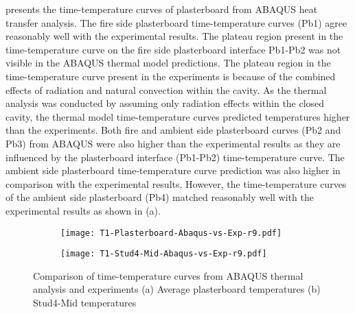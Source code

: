  presents the time-temperature curves of plasterboard from ABAQUS heat transfer analysis. The fire side plasterboard time-temperature curves (Pb1) agree reasonably well with the experimental results. The plateau region present in the time-temperature curve on the fire side plasterboard interface Pb1-Pb2 was not visible in the ABAQUS thermal model predictions. The plateau region in the time-temperature curve present in the experiments is because of the combined effects of radiation and natural convection within the cavity. As the thermal analysis was conducted by assuming only radiation effects within the closed cavity, the thermal model time-temperature curves predicted temperatures higher than the experiments. Both fire and ambient side plasterboard curves (Pb2 and Pb3) from ABAQUS were also higher than the experimental results as they are influenced by the plasterboard interface (Pb1-Pb2) time-temperature curve. The ambient side plasterboard time-temperature curve prediction was also higher in comparison with the experimental results. However, the time-temperature curves of the ambient side plasterboard (Pb4) matched reasonably well with the experimental results as shown in  (a).
\begin{figure}[!htbp]
	\centering
	\begin{subfigure}[b]{0.7\textwidth}
		\centering
		\texttt{[image: T1-Plasterboard-Abaqus-vs-Exp-r9.pdf]}
		\caption{}
		\label{subfig:T1-Plasterboard-Abaqus-vs-Exp-r9}
	\end{subfigure}
	\begin{subfigure}[b]{0.6\textwidth}
		\centering
		\texttt{[image: T1-Stud4-Mid-Abaqus-vs-Exp-r9.pdf]}
		\caption{}
		\label{subfig:T1-Stud4-Mid-Abaqus-vs-Exp-r9}
	\end{subfigure}
	   \caption{Comparison of time-temperature curves from ABAQUS thermal analysis and experiments (a) Average plasterboard temperatures (b) Stud4-Mid temperatures}
	   \label{fig:abaqus-output-pb-studs}
\end{figure}

